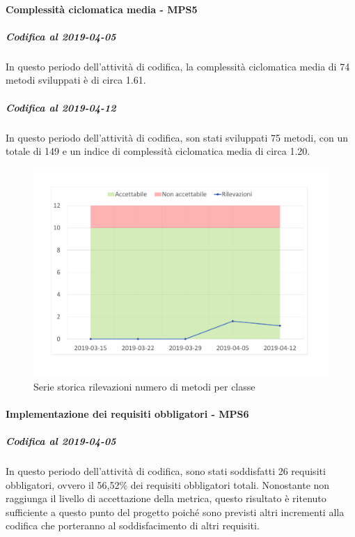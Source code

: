 \paragraph{Complessità ciclomatica media - MPS5}
\subparagraph{Codifica al 2019-04-05}
In questo periodo dell'attività di codifica, la complessità ciclomatica media di 74 metodi sviluppati è di circa 1.61. 

\subparagraph{Codifica al 2019-04-12}
In questo periodo dell'attività di codifica, son stati sviluppati 75 metodi, con un totale di 149 e un indice di complessità ciclomatica media di circa 1.20.
\begin{figure}[H]
	\centering
	\includegraphics[scale=0.6]{images/resoconto/MPS5Chart.pdf}
	\caption{Serie storica rilevazioni numero di metodi per classe}	
\end{figure}


\paragraph{Implementazione dei requisiti obbligatori - MPS6}
\subparagraph{Codifica al 2019-04-05}
In questo periodo dell'attività di codifica, sono stati soddisfatti 26 requisiti obbligatori, ovvero il 56,52\% dei requisiti obbligatori totali.
Nonostante non raggiunga il livello di accettazione della
metrica, questo risultato è ritenuto sufficiente a questo punto del progetto poiché sono previsti altri incrementi alla codifica che porteranno al soddisfacimento di altri requisiti.

